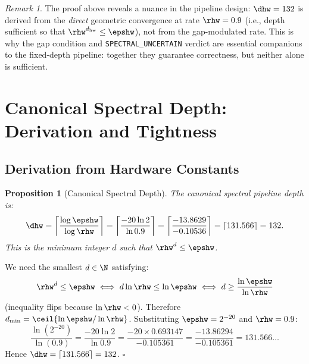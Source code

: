 \documentclass[12pt,letterpaper]{article}
\theoremstyle{plain}
\newtheorem{proposition}[theorem]{Proposition}
\theoremstyle{definition}
\theoremstyle{remark}
\newtheorem{remark}[theorem]{Remark}
\begin{document}
\begin{remark}
The proof above reveals a nuance in the pipeline design: \(\dhw = 132\)
is derived from the \emph{direct} geometric convergence at rate \(\rhw = 0.9\)
(i.e., depth sufficient so that \(\rhw^{d_{\mathrm{hw}}} \leq \epshw\)),
not from the gap-modulated rate. This is why the gap condition and
\texttt{SPECTRAL\_UNCERTAIN} verdict are essential companions to the
fixed-depth pipeline: together they guarantee correctness, but neither
alone is sufficient.
\end{remark}

\section{Canonical Spectral Depth: Derivation and Tightness}
\label{sec:depth}

\subsection{Derivation from Hardware Constants}

\begin{proposition}[Canonical Spectral Depth]
\label{prop:depth}
The canonical spectral pipeline depth is:
\begin{equation}
  \dhw = \left\lceil \frac{\log \epshw}{\log \rhw} \right\rceil
  = \left\lceil \frac{-20 \ln 2}{\ln 0.9} \right\rceil
  = \left\lceil \frac{-13.8629}{-0.10536} \right\rceil
  = \lceil 131.566 \rceil = 132.
  \label{eq:depth-main}
\end{equation}
This is the minimum integer \(d\) such that \(\rhw^d \leq \epshw\).
\end{proposition}

\begin{proofbox}
We need the smallest \(d \in \N\) satisfying:
\[
  \rhw^d \leq \epshw
  \;\Longleftrightarrow\;
  d \ln \rhw \leq \ln \epshw
  \;\Longleftrightarrow\;
  d \geq \frac{\ln \epshw}{\ln \rhw}
\]
(inequality flips because \(\ln \rhw < 0\)). Therefore \(d_{\min} = \ceil{\ln\epshw / \ln\rhw}\).
Substituting \(\epshw = 2^{-20}\) and \(\rhw = 0.9\):
\[
  \frac{\ln(2^{-20})}{\ln(0.9)} = \frac{-20\ln 2}{\ln 0.9}
  = \frac{-20 \times 0.693147}{-0.105361}
  = \frac{-13.86294}{-0.105361}
  = 131.566\ldots
\]
Hence \(\dhw = \lceil 131.566 \rceil = 132\). \hfill\(\square\)
\end{proofbox}
\end{document}
